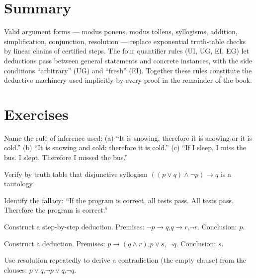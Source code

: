 \section{Summary}

Valid argument forms --- modus ponens, modus tollens, syllogisms, addition,
simplification, conjunction, resolution --- replace exponential truth-table
checks by linear chains of certified steps. The four quantifier rules
(UI, UG, EI, EG) let deductions pass between general statements and concrete
instances, with the side conditions ``arbitrary'' (UG) and ``fresh'' (EI).
Together these rules constitute the deductive machinery used implicitly by
every proof in the remainder of the book.

\section*{Exercises}

\begin{exercise}{\easy}
Name the rule of inference used: (a) ``It is snowing, therefore it is snowing
or it is cold.'' (b) ``It is snowing and cold; therefore it is cold.''
(c) ``If I sleep, I miss the bus. I slept. Therefore I missed the bus.''
\end{exercise}

\begin{exercise}{\easy}
Verify by truth table that disjunctive syllogism
$((p \vee q) \wedge \neg p) \to q$ is a tautology.
\end{exercise}

\begin{exercise}{\easy}
Identify the fallacy: ``If the program is correct, all tests pass. All tests
pass. Therefore the program is correct.''
\end{exercise}

\begin{exercise}{\medium}
Construct a step-by-step deduction. Premises:
$\neg p \to q$,\quad $q \to r$,\quad $\neg r$. Conclusion: $p$.
\end{exercise}

\begin{exercise}{\medium}
Construct a deduction. Premises: $p \to (q \wedge r)$,\quad $p \vee s$,\quad
$\neg q$. Conclusion: $s$.
\end{exercise}

\begin{exercise}{\medium}
Use resolution repeatedly to derive a contradiction (the empty clause) from
the clauses: $p \vee q$,\quad $\neg p \vee q$,\quad $\neg q$.
\end{exercise}

